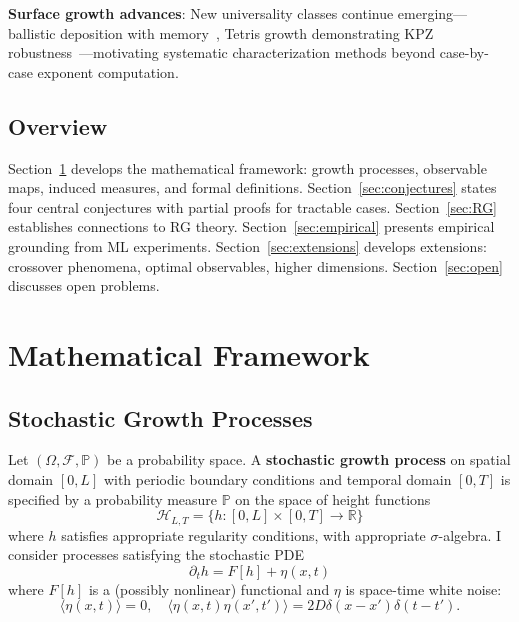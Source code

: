 \documentclass[aps,pre,reprint,amsmath,amssymb,superscriptaddress]{revtex4-2}
\newcommand{\calH}{\mathcal{H}}
\newcommand{\calF}{\mathcal{F}}
\newcommand{\bbP}{\mathbb{P}}
\newcommand{\bbR}{\mathbb{R}}
\begin{document}
\textbf{Surface growth advances}: New universality classes continue emerging---ballistic deposition with memory~\cite{Kolakowska2024}, Tetris growth demonstrating KPZ robustness~\cite{Coupier2024}---motivating systematic characterization methods beyond case-by-case exponent computation.

\subsection{Overview}

Section~\ref{sec:framework} develops the mathematical framework: growth processes, observable maps, induced measures, and formal definitions. Section~\ref{sec:conjectures} states four central conjectures with partial proofs for tractable cases. Section~\ref{sec:RG} establishes connections to RG theory. Section~\ref{sec:empirical} presents empirical grounding from ML experiments. Section~\ref{sec:extensions} develops extensions: crossover phenomena, optimal observables, higher dimensions. Section~\ref{sec:open} discusses open problems.

\section{Mathematical Framework}
\label{sec:framework}

\subsection{Stochastic Growth Processes}

Let $(\Omega, \calF, \bbP)$ be a probability space. A \textbf{stochastic growth process} on spatial domain $[0,L]$ with periodic boundary conditions and temporal domain $[0,T]$ is specified by a probability measure $\bbP$ on the space of height functions
\begin{equation}
\calH_{L,T} = \{h: [0,L] \times [0,T] \to \bbR\}
\end{equation}
where $h$ satisfies appropriate regularity conditions, with appropriate $\sigma$-algebra. I consider processes satisfying the stochastic PDE
\begin{equation}
\partial_t h = F[h] + \eta(x,t)
\end{equation}
where $F[h]$ is a (possibly nonlinear) functional and $\eta$ is space-time white noise:
\begin{equation}
\langle \eta(x,t) \rangle = 0, \quad \langle \eta(x,t)\eta(x',t') \rangle = 2D \delta(x-x')\delta(t-t').
\end{equation}
\end{document}
